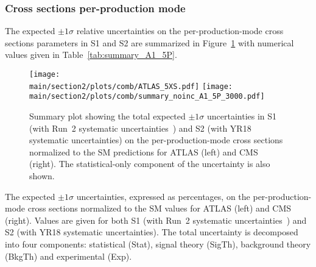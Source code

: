 \subsubsection{Cross sections per-production mode}

The expected $\pm 1\sigma$ relative uncertainties on the per-production-mode cross sections parameters in S1 and S2 are summarized in Figure~\ref{fig:summary_A1_5P} with numerical values given in Table~\ref{tab:summary_A1_5P}.


\begin{figure}[hbtp]
\centering
\texttt{[image: \\main/section2/plots/comb/ATLAS\_5XS.pdf]}%
\texttt{[image: \\main/section2/plots/comb/summary\_noinc\_A1\_5P\_3000.pdf]}%
\caption{Summary plot showing the total expected $\pm 1\sigma$ uncertainties in S1 (with Run~2 systematic uncertainties~\cite{Sirunyan:2018koj}) and S2 (with YR18 systematic uncertainties) on the per-production-mode cross sections normalized to the SM predictions  for  ATLAS (left) and CMS (right). The statistical-only component of the uncertainty is also shown.}
\label{fig:summary_A1_5P}
\end{figure}


\begin{table}[hbtp]
\centering
\caption{The expected $\pm 1\sigma$ uncertainties, expressed as percentages, on the per-production-mode cross sections normalized to the SM values  for  ATLAS (left) and CMS (right). Values are given for both S1 (with Run~2 systematic uncertainties~\cite{Sirunyan:2018koj}) and S2 (with YR18 systematic uncertainties). The total uncertainty is decomposed into four components: statistical (Stat), signal theory (SigTh), background theory (BkgTh) and experimental (Exp).}


\label{tab:summary_A1_5P}
\vspace{0.5cm}
\end{table}

